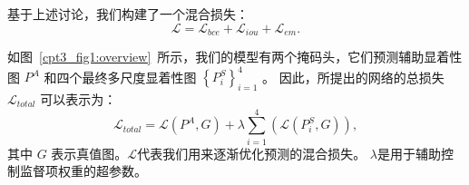 %
%
%
%
%
%
基于上述讨论，我们构建了一个混合损失：
%
%
%
\begin{equation} 
	\mathcal L = \mathcal L_{bce} + \mathcal L_{iou}  + \mathcal L_{em}  .
\end{equation}
%
%
%
%
\par
%
%
如图~\ref{cpt3_fig1:overview}~所示，我们的模型有两个掩码头，它们预测辅助显着性图 $ P^{A} $ 和四个最终多尺度显着性图 $ \left \{ P_{i}^{S} \right \}_{i=1}^{4} $ 。 因此，所提出的网络的总损失 $ \mathcal L_{total} $ 可以表示为： 
%
\begin{equation}
	\mathcal L_{total} = \mathcal L\left ( P^{A}, G \right ) + \lambda  \sum_{i=1}^{4} \left ( \mathcal L \left (  P_{i}^{S},G \right )\right ),
\end{equation}
%
%
%
其中 $ G $ 表示真值图。$ \mathcal L $代表我们用来逐渐优化预测的混合损失。 $ \lambda $是用于辅助控制监督项权重的超参数。






















